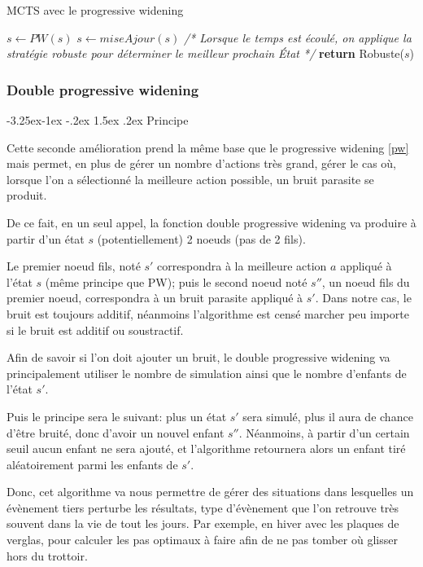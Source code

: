 \documentclass[pdftex,french, english]{article}	%
\makeatletter
\newcounter {subsubsubsection}[subsubsection]
\newcommand\subsubsubsection{\@startsection{subsubsubsection}{4}{\z@}%
                                     {-3.25ex\@plus -1ex \@minus -.2ex}%
                                     {1.5ex \@plus .2ex}%
                                     {\normalfont\normalsize\bfseries}}
\makeatother
\begin{document}
		\begin{algorithm}[H]
			\caption{MCTS avec le progressive widening}
			\label{alg:mctspw}
				\begin{algorithmic}[1]
								\State $s \gets PW(s)$ 
							\EndWhile
						\State $s \gets miseAjour(s)$
						\EndWhile
						\State \textit{/* Lorsque le temps est écoulé, on applique la stratégie robuste pour déterminer le meilleur prochain État */}
					\State \textbf{return} Robuste($s$)
					\EndFunction
				\end{algorithmic}
		\end{algorithm}
	\subsubsection{Double progressive widening} \label{dpw}
		\subsubsubsection{Principe} \label{dpw:principe}

			Cette seconde amélioration prend la même base que le progressive widening \ref{pw} mais permet, en plus de gérer un nombre d'actions très grand, gérer le cas où, lorsque l'on a sélectionné la meilleure action possible, un bruit parasite se produit.

			De ce fait, en un seul appel, la fonction double progressive widening va produire à partir d'un état $s$ (potentiellement) 2 noeuds (pas de 2 fils).

			Le premier noeud fils, noté $s'$ correspondra à la meilleure action $a$ appliqué à l'état $s$ (même principe que PW); puis le second noeud noté $s''$, un noeud fils du premier noeud, correspondra à un bruit parasite appliqué à $s'$.
			Dans notre cas, le bruit est toujours additif, néanmoins l'algorithme est censé marcher peu importe si le bruit est additif ou soustractif.

			Afin de savoir si l'on doit ajouter un bruit, le double progressive widening va principalement utiliser le nombre de simulation ainsi que le nombre d'enfants de l'état $s'$.

			Puis le principe sera le suivant: plus un état $s'$ sera simulé, plus il aura de chance d'être bruité, donc d'avoir un nouvel enfant $s''$. Néanmoins, à partir d'un certain seuil aucun enfant ne sera ajouté, et l'algorithme retournera alors un enfant tiré aléatoirement parmi les enfants de $s'$.

			Donc, cet algorithme va nous permettre de gérer des situations dans lesquelles un évènement tiers perturbe les résultats, type d'évènement que l'on retrouve très souvent dans la vie de tout les jours. Par exemple, en hiver avec les plaques de verglas, pour calculer les pas optimaux à faire afin de ne pas tomber où glisser hors du trottoir.
\end{document}
